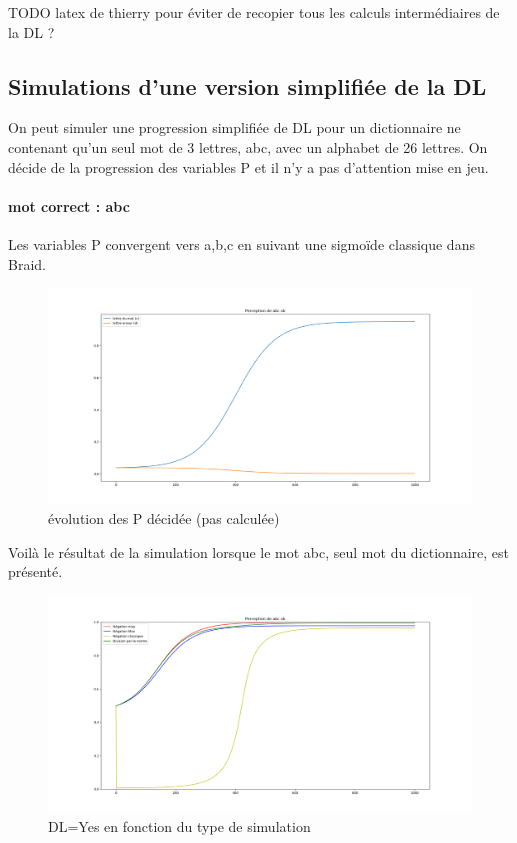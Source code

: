 \documentclass{article}
\begin{document}
TODO latex de thierry pour éviter de recopier tous les calculs intermédiaires de la DL ?
 
 
  

    
\subsection{Simulations d'une version simplifiée de la DL}

On peut simuler une progression simplifiée de DL pour un dictionnaire ne contenant qu'un seul mot de 3 lettres, abc, avec un alphabet de 26 lettres. On décide de la progression des variables P et il n'y a pas d'attention mise en jeu.

\paragraph{mot correct : abc}
Les variables P convergent vers a,b,c en suivant une sigmoïde classique dans Braid.


\begin{figure}[H]
\centering
	\includegraphics[scale=0.3]{P_abc.png}
	\caption{évolution des P décidée (pas calculée)}
\end{figure} 


Voilà le résultat de la simulation lorsque le mot abc, seul mot du dictionnaire, est présenté.

\begin{figure}[H]
\centering
	\includegraphics[scale=0.3]{abc.png}
	\caption{DL=Yes en fonction du type de simulation}
\end{figure} 
\end{document}
